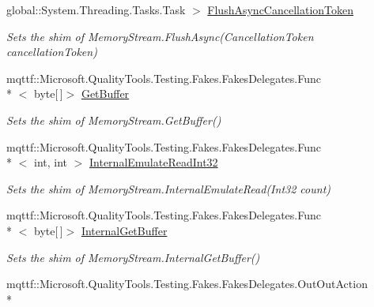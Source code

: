 \begin{DoxyCompactItemize}
global\-::\-System.\-Threading.\-Tasks.\-Task $>$ \hyperlink{class_system_1_1_i_o_1_1_fakes_1_1_shim_memory_stream_abd0da6a8ebefd94b84f83067431e9df1}{Flush\-Async\-Cancellation\-Token}
\begin{DoxyCompactList}\small\item\em Sets the shim of Memory\-Stream.\-Flush\-Async(\-Cancellation\-Token cancellation\-Token)\end{DoxyCompactList}\item 
mqttf\-::\-Microsoft.\-Quality\-Tools.\-Testing.\-Fakes.\-Fakes\-Delegates.\-Func\\*
$<$ byte\mbox{[}$\,$\mbox{]}$>$ \hyperlink{class_system_1_1_i_o_1_1_fakes_1_1_shim_memory_stream_a37ecbd7d3da63badc9f845088ac2e0d3}{Get\-Buffer}
\begin{DoxyCompactList}\small\item\em Sets the shim of Memory\-Stream.\-Get\-Buffer()\end{DoxyCompactList}\item 
mqttf\-::\-Microsoft.\-Quality\-Tools.\-Testing.\-Fakes.\-Fakes\-Delegates.\-Func\\*
$<$ int, int $>$ \hyperlink{class_system_1_1_i_o_1_1_fakes_1_1_shim_memory_stream_acedfddf49e0caa146c4f551b5361e56c}{Internal\-Emulate\-Read\-Int32}
\begin{DoxyCompactList}\small\item\em Sets the shim of Memory\-Stream.\-Internal\-Emulate\-Read(\-Int32 count)\end{DoxyCompactList}\item 
mqttf\-::\-Microsoft.\-Quality\-Tools.\-Testing.\-Fakes.\-Fakes\-Delegates.\-Func\\*
$<$ byte\mbox{[}$\,$\mbox{]}$>$ \hyperlink{class_system_1_1_i_o_1_1_fakes_1_1_shim_memory_stream_ada2220bca362b0167caba5f03753c635}{Internal\-Get\-Buffer}
\begin{DoxyCompactList}\small\item\em Sets the shim of Memory\-Stream.\-Internal\-Get\-Buffer()\end{DoxyCompactList}\item 
mqttf\-::\-Microsoft.\-Quality\-Tools.\-Testing.\-Fakes.\-Fakes\-Delegates.\-Out\-Out\-Action\\*

\end{DoxyCompactItemize}
